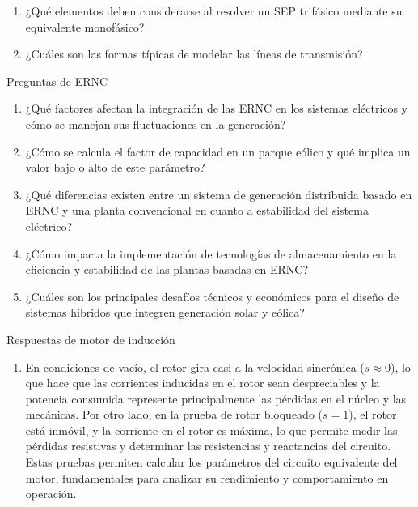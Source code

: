 \documentclass[
  11pt,
  letterpaper,
   addpoints,
   answers
  ]{exam}
\begin{document}
\begin{questions}
\begin{enumerate}
        \item ¿Qué elementos deben considerarse al resolver un SEP trifásico mediante su equivalente monofásico?
    
        \item ¿Cuáles son las formas típicas de modelar las líneas de transmisión?
    \end{enumerate}

    Preguntas de ERNC

    \begin{enumerate}
        \item ¿Qué factores afectan la integración de las ERNC en los sistemas eléctricos y cómo se manejan sus fluctuaciones en la generación?
        
        \item ¿Cómo se calcula el factor de capacidad en un parque eólico y qué implica un valor bajo o alto de este parámetro?
        
        \item ¿Qué diferencias existen entre un sistema de generación distribuida basado en ERNC y una planta convencional en cuanto a estabilidad del sistema eléctrico?
        
        \item ¿Cómo impacta la implementación de tecnologías de almacenamiento en la eficiencia y estabilidad de las plantas basadas en ERNC?
    
        \item ¿Cuáles son los principales desafíos técnicos y económicos para el diseño de sistemas híbridos que integren generación solar y eólica?
    \end{enumerate}
    \begin{solution}
        Respuestas de motor de inducción
        \begin{enumerate}
            \item En condiciones de vacío, el rotor gira casi a la velocidad sincrónica (\(s \approx 0\)), lo que hace que las corrientes inducidas en el rotor sean despreciables y la potencia consumida represente principalmente las pérdidas en el núcleo y las mecánicas. Por otro lado, en la prueba de rotor bloqueado (\(s = 1\)), el rotor está inmóvil, y la corriente en el rotor es máxima, lo que permite medir las pérdidas resistivas y determinar las resistencias y reactancias del circuito. Estas pruebas permiten calcular los parámetros del circuito equivalente del motor, fundamentales para analizar su rendimiento y comportamiento en operación.
        

\end{enumerate}
\end{solution}
\end{questions}
\end{document}
